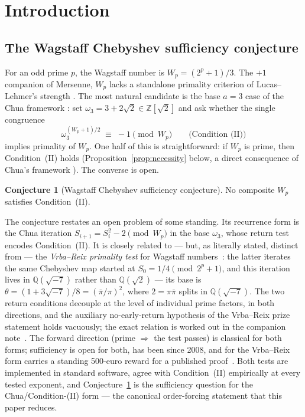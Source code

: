 \documentclass[11pt]{amsart}
\theoremstyle{plain}
\theoremstyle{definition}
\newtheorem{conjecture}[theorem]{Conjecture}
\theoremstyle{remark}
\numberwithin{equation}{section}
\newcommand{\Z}{\mathbb{Z}}
\newcommand{\Q}{\mathbb{Q}}
\begin{document}
\section{Introduction}

\subsection{The Wagstaff Chebyshev sufficiency conjecture}

For an odd prime $p$, the Wagstaff number is $W_p = (2^p + 1)/3$. The $+1$ companion of Mersenne, $W_p$ lacks a standalone primality criterion of Lucas--Lehmer's strength \cite{ref:Williams}. The most natural candidate is the base $a = 3$ case of the Chua framework \cite{ref:Chua}: set $\omega_3 = 3 + 2\sqrt{2} \in \Z[\sqrt 2]$ and ask whether the single congruence
\[
  \omega_3^{(W_p + 1)/2} \;\equiv\; -1 \pmod{W_p} \qquad \text{(Condition (II))}
\]
implies primality of $W_p$. One half of this is straightforward: if $W_p$ is prime, then Condition~(II) holds (Proposition~\ref{prop:necessity} below, a direct consequence of Chua's framework \cite{ref:Chua}). The converse is open.

\begin{conjecture}[Wagstaff Chebyshev sufficiency conjecture]\label{conj:suff}
No composite $W_p$ satisfies Condition~(II).
\end{conjecture}

The conjecture restates an open problem of some standing. Its recurrence form is the Chua iteration $S_{i+1} = S_i^2 - 2 \pmod{W_p}$ in the base $\omega_3$, whose return test encodes Condition~(II). It is closely related to --- but, as literally stated, distinct from --- the \emph{Vrba--Reix primality test} for Wagstaff numbers~\cite{ref:VrbaReix}: the latter iterates the same Chebyshev map started at $S_0 = 1/4 \pmod{2^p + 1}$, and this iteration lives in $\Q(\sqrt{-7})$ rather than $\Q(\sqrt 2)$ --- its base is $\theta = (1 + 3\sqrt{-7})/8 = (\bar\pi/\pi)^2$, where $2 = \pi\bar\pi$ splits in $\Q(\sqrt{-7})$. The two return conditions decouple at the level of individual prime factors, in both directions, and the auxiliary no-early-return hypothesis of the Vrba--Reix prize statement holds vacuously; the exact relation is worked out in the companion note~\cite{ref:VRNote}. The forward direction (prime $\Rightarrow$ the test passes) is classical for both forms; sufficiency is open for both, has been since 2008, and for the Vrba--Reix form carries a standing 500-euro reward for a published proof~\cite{ref:VrbaReix}. Both tests are implemented in standard software, agree with Condition~(II) empirically at every tested exponent, and Conjecture~\ref{conj:suff} is the sufficiency question for the Chua/Condition-(II) form --- the canonical order-forcing statement that this paper reduces.
\end{document}
